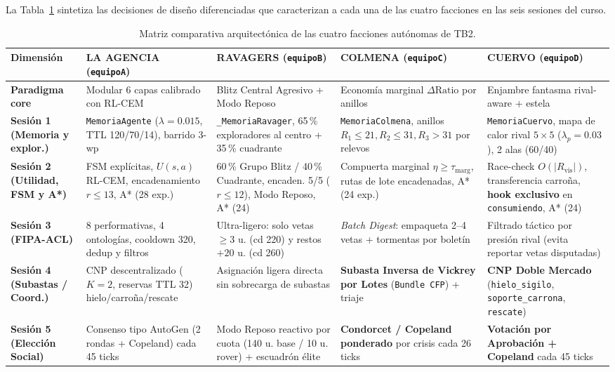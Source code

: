\documentclass[10pt,a4paper]{article}
\begin{document}
La Tabla~\ref{tab:matriz_equipos} sintetiza las decisiones de diseño diferenciadas que caracterizan a cada una de las cuatro facciones en las seis sesiones del curso.

\begin{table}[H]
\centering
\caption{Matriz comparativa arquitectónica de las cuatro facciones autónomas de TB2.}\label{tab:matriz_equipos}
\scriptsize
\renewcommand{\arraystretch}{1.18}
\begin{tabularx}{\textwidth}{>{\bfseries}l X X X X}
\toprule
Dimensión & \textbf{LA AGENCIA} (\texttt{equipoA}) & \textbf{RAVAGERS} (\texttt{equipoB}) & \textbf{COLMENA} (\texttt{equipoC}) & \textbf{CUERVO} (\texttt{equipoD}) \\
\midrule
Paradigma core & Modular 6 capas calibrado con RL-CEM & Blitz Central Agresivo + Modo Reposo & Economía marginal $\Delta\text{Ratio}$ por anillos & Enjambre fantasma rival-aware + estela \\
Sesión 1 (Memoria y explor.) & \texttt{MemoriaAgente} ($\lambda=0.015$, TTL 120/70/14), barrido 3-wp & \texttt{\_MemoriaRavager}, 65\,\% exploradores al centro + 35\,\% cuadrante & \texttt{MemoriaColmena}, anillos $R_1{\le}21, R_2{\le}31, R_3{>}31$ por relevos & \texttt{MemoriaCuervo}, mapa de calor rival $5\times 5$ ($\lambda_p=0.03$), 2 alas (60/40) \\
Sesión 2 (Utilidad, FSM y A*) & FSM explícitas, $U(s,a)$ RL-CEM, encadenamiento $r\le 13$, A* (28 exp.) & 60\,\% Grupo Blitz / 40\,\% Cuadrante, encaden. 5/5 ($r\le 12$), Modo Reposo, A* (24) & Compuerta marginal $\eta\ge\tau_{\text{marg}}$, rutas de lote encadenadas, A* (24 exp.) & Race-check $O(|R_{\text{vis}}|)$, transferencia carroña, \textbf{hook exclusivo} en \texttt{consumiendo}, A* (24) \\
Sesión 3 (FIPA-ACL) & 8 performativas, 4 ontologías, cooldown 320, dedup y filtros & Ultra-ligero: solo vetas $\ge 3$ u. (cd 220) y restos $+20$ u. (cd 260) & \emph{Batch Digest}: empaqueta 2--4 vetas + tormentas por boletín & Filtrado táctico por presión rival (evita reportar vetas disputadas) \\
Sesión 4 (Subastas / Coord.) & CNP descentralizado ($K=2$, reservas TTL 32) hielo/carroña/rescate & Asignación ligera directa sin sobrecarga de subastas & \textbf{Subasta Inversa de Vickrey por Lotes} (\texttt{Bundle CFP}) + triaje & \textbf{CNP Doble Mercado} (\texttt{hielo\_sigilo}, \texttt{soporte\_carrona}, \texttt{rescate}) \\
Sesión 5 (Elección Social) & Consenso tipo AutoGen (2 rondas + Copeland) cada 45 ticks & Modo Reposo reactivo por cuota (140 u. base / 10 u. rover) + escuadrón élite & \textbf{Condorcet / Copeland ponderado} por crisis cada 26 ticks & \textbf{Votación por Aprobación + Copeland} cada 45 ticks \\

\end{tabularx}
\end{table}
\end{document}
